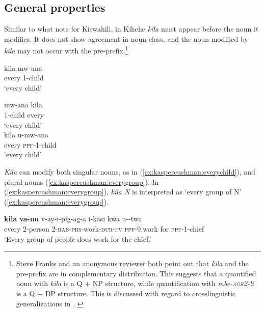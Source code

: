 \documentclass[output=paper,modfonts,nonflat]{langsci/langscibook}
\begin{document}
\subsection{General properties}

Similar to what \citealt{zerbian08} note for Kiswahili, in Kihehe \textit{kila} must appear before the noun it modifies. It does not show agreement in noun class, and the noun modified by \textit{kila} may not occur with the pre-prefix.\footnote{Steve
    Franks and an anonymous reviewer both point out that \textit{kila} and the pre-prefix are in complementary distribution.  This suggests that a quantified noun with \textit{kila} is a Q + NP structure, while quantification with \textit{mbe-\textsc{agr2}-li} is a Q + DP structure. This is discussed with regard to crosslinguistic generalizations in . \label{foot:kaspercushman:1}
}

\begin{exe} 
\ex \begin{xlist}
\ex 
\gll kila mw-ana \\ 
every 1-child \\
\glt `every child' \\ \label{ex:kaspercushman:everychild} 

\ex 
\gll * mw-ana kila \\
{} 1-child every \\
\glt `every child' \\


\ex 
\gll * kila u-mw-ana \label{ex:kaspercushman:everyppfn}\\
{} every \textsc{ppf}-1-child \\
\glt `every child'


\end{xlist}
\end{exe} 

\textit{Kila} can modify both singular nouns, as in (\ref{ex:kaspercushman:everychild}), and plural nouns (\ref{ex:kaspercushman:everygroup}). In (\ref{ex:kaspercushman:everygroup}), \textit{kila N} is interpreted as `every group of N' (\ref{ex:kaspercushman:everygroup}).   


\begin{exe}

\ex 
\gll \textbf{kila} \textbf{va-nu} v-ay-i-pig-ag-a i-kasi kwa u--twa \\
every 2-person 2-\textsc{hab}-\textsc{prs}-work-\textsc{dur}-\textsc{fv} \textsc{ppf}-9.work for \textsc{ppf}-1-chief \\
\glt `Every group of people does work for the chief.' \label{ex:kaspercushman:everygroup}

\end{exe}
\end{document}
